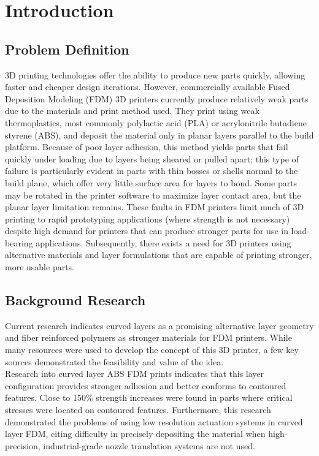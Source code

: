 \section{Introduction}

\subsection{Problem Definition}

\indent

3D printing technologies offer the ability to produce new parts quickly, allowing faster and cheaper design iterations. However, commercially available Fused Deposition Modeling (FDM) 3D printers currently produce relatively weak parts due to the materials and print method used. They print using weak thermoplastics, most commonly polylactic acid (PLA) or acrylonitrile butadiene styrene (ABS), and deposit the material only in planar layers parallel to the build platform. Because of poor layer adhesion, this method yields parts that fail quickly under loading due to layers being sheared or pulled apart; this type of failure is particularly evident in parts with thin bosses or shells normal to the build plane, which offer very little surface area for layers to bond. Some parts may be rotated in the printer software to maximize layer contact area, but the planar layer limitation remains. These faults in FDM printers limit much of 3D printing to rapid prototyping applications (where strength is not necessary) despite high demand for printers that can produce stronger parts for use in load-bearing applications. Subsequently, there exists a need for 3D printers using alternative materials and layer formulations that are capable of printing stronger, more usable parts.\\

\subsection{Background Research}

\indent

Current research indicates curved layers as a promising alternative layer geometry and fiber reinforced polymers as stronger  materials for FDM printers. While many resources were used to develop the concept of this 3D printer, a few key sources demonstrated the feasibility and value of the idea.\\

Research into curved layer ABS FDM prints indicates that this layer configuration provides stronger adhesion and better conforms to contoured features. Close to 150\% strength increases were found in parts where critical stresses were located on contoured features. Furthermore, this research demonstrated the problems of using low resolution actuation systems in curved layer FDM, citing difficulty in precisely depositing the material when high-precision, industrial-grade nozzle translation systems are not used.\cite{cute-curves}\\

